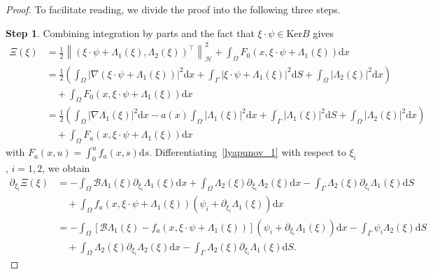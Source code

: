 \documentclass[10pt,a4paper]{amsart}
\begin{document}
\begin{proof}
To facilitate reading, we divide the proof into the following three steps.

\textbf{Step 1}. Combining integration by parts and the fact that $\xi\cdot\psi\in\mathrm{Ker}B$ gives
\begin{equation} \label{lyapunov_1}
\begin{split}
\Xi(\xi) &= \frac{1}{2}\left\|\left(\xi\cdot\psi + \Lambda_1(\xi), \Lambda_2(\xi)\right)^{\top}\right\|^2_{\mathcal{H}} + \int_{\Omega}F_0(x, \xi\cdot\psi + \Lambda_1(\xi))\mathrm{d}x\\
&= \frac{1}{2}\left(\int_{\Omega}|\nabla (\xi\cdot\psi + \Lambda_1(\xi))|^2\mathrm{d}x + \int_{\Gamma}|\xi\cdot\psi +\Lambda_1(\xi)|^2\mathrm{d}S + \int_{\Omega}|\Lambda_2(\xi)|^2\mathrm{d}x\right) \\
&\quad + \int_{\Omega}F_0(x, \xi\cdot\psi + \Lambda_1(\xi))\mathrm{d}x\\
&= \frac{1}{2}\left(\int_{\Omega}|\nabla  \Lambda_1(\xi)|^2\mathrm{d}x - a(x)\int_{\Omega}|  \Lambda_1(\xi)|^2\mathrm{d}x + \int_{\Gamma}|\Lambda_1(\xi)|^2\mathrm{d}S + \int_{\Omega}|\Lambda_2(\xi)|^2\mathrm{d}x\right) \\
&\quad+\int_{\Omega}F_a(x, \xi\cdot\psi + \Lambda_1(\xi))\mathrm{d}x
\end{split}
\end{equation}
with $F_a(x, u)=\int_{0}^{u}f_a(x, s)\mathrm{d}s$.
Differentiating~\eqref{lyapunov_1} with respect to $\xi_i$, $i=1, 2$, we obtain
\begin{equation}\label{lyapunov_2}
\begin{split}
\partial_{\xi_i}\Xi(\xi) &=  -\int_{\Omega}\mathcal{B}\Lambda_1(\xi)\partial_{\xi_i}\Lambda_1(\xi)\mathrm{d}x + \int_{\Omega}\Lambda_2(\xi)\partial_{\xi_i}\Lambda_2(\xi)\mathrm{d}x-\int_{\Gamma} \Lambda_2(\xi)\partial_{\xi_i}\Lambda_1(\xi)\mathrm{d}S\\
&\quad + \int_{\Omega}f_a(x, \xi\cdot\psi + \Lambda_1(\xi))(\psi_i + \partial_{\xi_i}\Lambda_1(\xi))\mathrm{d}x\\
&=  -\int_{\Omega}[\mathcal{B}\Lambda_1(\xi)-f_a(x, \xi\cdot\psi + \Lambda_1(\xi))](\psi_i + \partial_{\xi_i}\Lambda_1(\xi))\mathrm{d}x - \int_{\Gamma}\psi_i \Lambda_2(\xi)\mathrm{d}S\\
&\quad + \int_{\Omega}\Lambda_2(\xi)\partial_{\xi_i}\Lambda_2(\xi)\mathrm{d}x-\int_{\Gamma} \Lambda_2(\xi)\partial_{\xi_i}\Lambda_1(\xi)\mathrm{d}S.
\end{split}
\end{equation}

\end{proof}
\end{document}
